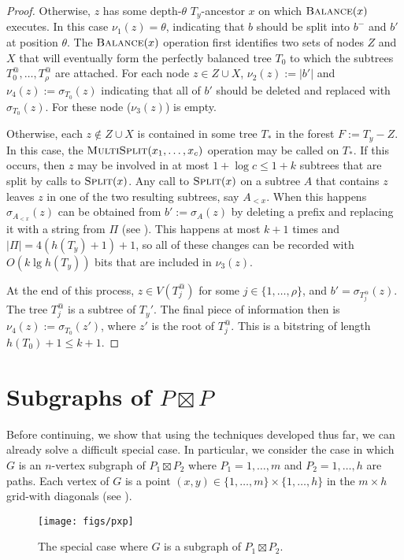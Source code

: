 \documentclass[kpfonts]{patmorin}
\begin{document}
\begin{proof}
  Otherwise, $z$ has some depth-$\theta$ $T_y$-ancestor $x$ on which $\textsc{Balance}(x)$ executes. In this case $\nu_{1}(z)=\theta$, indicating that $b$ should be split into $b^-$ and $b'$ at position $\theta$.  
  The $\textsc{Balance}(x)$ operation first identifies two sets of nodes $Z$ and $X$ that will eventually form the perfectly balanced tree $T_0$ to which the subtrees $T^@_0,\ldots,T^@_\rho$ are attached.  For each node $z\in Z\cup X$, $\nu_{2}(z):=|b'|$ and $\nu_{4}(z):=\sigma_{T_0}(z)$ indicating that all of $b'$ should be deleted and replaced with $\sigma_{T_0}(z)$.  For these node ($\nu_3(z)$) is empty.
    
  Otherwise, each $z\not\in Z\cup X$ is contained in some tree $T_*$ in the forest $F:=T_y-Z$.  In this case, the $\textsc{MultiSplit}(x_1,\ldots,x_c)$ operation may be called on $T_*$.  If this occurs, then $z$ may be involved in at most $1+\log c\le 1+k$ subtrees that are split by calls to $\textsc{Split}(x)$.  Any call to $\textsc{Split}(x)$ on a subtree $A$ that contains $z$ leaves $z$ in one of the two resulting subtrees, say $A_{<x}$.  When this happens $\sigma_{A_{<x}}(z)$ can be obtained from $b':=\sigma_{A}(z)$ by deleting a prefix and replacing it with a string from $\Pi$ (see ).  This happens at most $k+1$ times and $|\Pi|= 4(h(T_y)+1)+1$, so all of these changes can be recorded with $O(k\lg h(T_y))$ bits that are included in $\nu_{3}(z)$.
  
  At the end of this process, $z\in V(T^@_j)$ for some $j\in\{1,\ldots,\rho\}$, and $b'=\sigma_{T^@_j}(z)$.  The tree $T^@_j$ is a subtree of $T_y'$.  The final piece of information then is $\nu_4(z):=\sigma_{T_0}(z')$, where $z'$ is the root of $T^@_j$.  This is a bitstring of length $h(T_0)+1\le k+1$.
\end{proof}

\section{Subgraphs of $P\boxtimes P$}

Before continuing, we show that using the techniques developed thus far, we can already solve a difficult special case.  In particular, we consider the case in which $G$ is an $n$-vertex subgraph of $P_1\boxtimes P_2$ where $P_1=1,\ldots,m$ and $P_2=1,\ldots,h$ are paths. Each vertex of $G$ is a point $(x,y)\in\{1,\ldots,m\}\times \{1,\ldots,h\}$ in the $m\times h$ grid-with diagonals (see ).

\begin{figure}
  \begin{center}
    \texttt{[image: figs/pxp]}
  \end{center}
  \caption{The special case where $G$ is a subgraph of $P_1\boxtimes P_2$.}
\end{figure}
\end{document}
